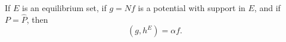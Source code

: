 If $E$ is an equilibrium set, if $g = Nf$ is a potential with support in $E$, and if $P = \hat{P}$, then
$$(g, h^E) = \alpha f.$$
